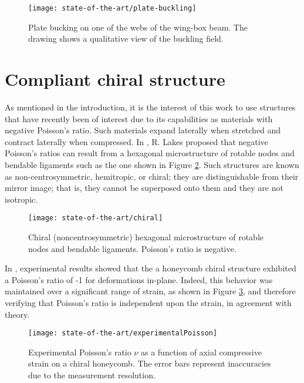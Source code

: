   \begin{figure}[!htpb]
    \centering
    \texttt{[image: state-of-the-art/plate-buckling]}
    \caption[Plate bucking on one of the webs of the wing-box beam]{Plate bucking on one of the webs of the wing-box beam. The drawing shows a qualitative view of the buckling field. \cite{Runkel2016}}\label{fig:plate-buckling}
  \end{figure}

\clearpage
\section{Compliant chiral structure} \label{sec:chiral_state}

  As mentioned in the introduction, it is the interest of this work to use structures that have recently been of interest due to its capabilities as materials with negative Poisson's ratio. Such materials expand laterally when stretched and contract laterally when compressed. In \cite{Lakes1991}, R. Lakes proposed that negative Poisson's ratios can result from a hexagonal microstructure of rotable nodes and bendable ligaments such as the one shown in Figure \ref{fig:chiral}. Such structures are known as non-centrosymmetric, hemitropic, or chiral; they are distinguishable from their mirror image; that is, they cannot be superposed onto them and they are not isotropic.

  \begin{figure}[!htpb]
    \centering
    \texttt{[image: state-of-the-art/chiral]}
    \caption[Chiral structure of rotable nodes and bendable ligaments]{Chiral (noncentrosymmetric) hexagonal microstructure of rotable nodes and bendable ligaments. Poisson's ratio is negative. \cite{Lakes1991}}\label{fig:chiral}
  \end{figure}

  In \cite{Prall1997}, experimental results showed that the a honeycomb chiral structure exhibited a Poisson's ratio of -1 for deformations in-plane. Indeed, this behavior was maintained over a significant range of strain, as shown in Figure \ref{fig:experimentalPoisson}, and therefore verifying that Poisson's ratio is independent upon the strain, in agreement with theory. 
  \begin{figure}[!htpb]
    \centering
    \texttt{[image: state-of-the-art/experimentalPoisson]}
    \caption[Experimental Poisson's ratio $v$ as a function of axial compressive strain on a chiral honeycomb]{Experimental Poisson's ratio $\nu$ as a function of axial compressive strain on a chiral honeycomb. The error bars represent inaccuracies due to the measurement resolution. \cite{Prall1997}}\label{fig:experimentalPoisson}
  \end{figure}

